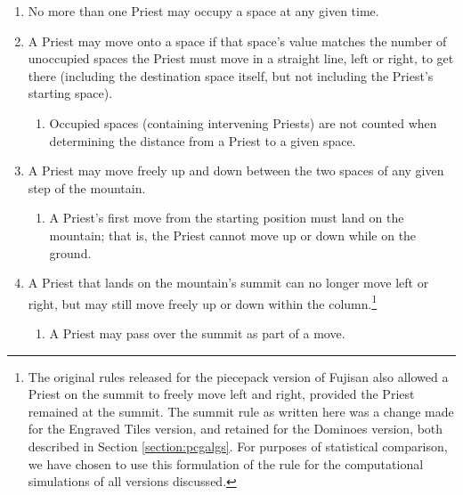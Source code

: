 \documentclass[journal]{IEEEtran}
\begin{document}
\begin{enumerate}
\item No more than one Priest may occupy a space at any given time.

\item A Priest may move onto a space if that space's value matches the number of unoccupied spaces the Priest must move in a straight line, left or right, to get there (including the destination space itself, but not including the Priest's starting space). %
\begin{enumerate}
\item Occupied spaces (containing intervening Priests) are not counted when determining the distance from a Priest to a given space. %
\end{enumerate}
\item A Priest may move freely up and down between the two spaces of any given step of the mountain. %
\begin{enumerate}
\item A Priest's first move from the starting position must land on the mountain; that is, the Priest cannot move up or down while on the ground.
\end{enumerate}

\item A Priest that lands on the mountain's summit can no longer move left or right, but may still move freely up or down within the column.\footnote{The original rules released for the piecepack version of Fujisan also allowed a Priest on the summit to freely move left and right, provided the Priest remained at the summit. The summit rule as written here was a change made for the Engraved Tiles version, and retained for the Dominoes version, both described in Section \ref{section:pcgalgs}. For purposes of statistical comparison, we have chosen to use this formulation of the rule for the computational simulations of all versions discussed.}
\begin{enumerate}
\item A Priest may pass over the summit as part of a move.
\end{enumerate}
\end{enumerate}
\end{document}
